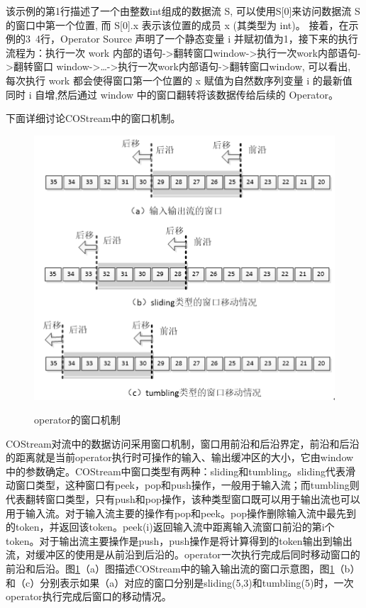 该示例的第1行描述了一个由整数int组成的数据流 S, 可以使用S[0]来访问数据流 S 的窗口中第一个位置, 而 S[0].x 表示该位置的成员 x (其类型为 int)。 接着，在示例的3~4行，Operator Source 声明了一个静态变量 i 并赋初值为1，接下来的执行流程为：执行一次 work 内部的语句->翻转窗口window->执行一次work内部语句->翻转窗口 window->…->执行一次work内部语句->翻转窗口window, 可以看出, 每次执行 work 都会使得窗口第一个位置的 x 赋值为自然数序列变量 i 的最新值 同时 i 自增,然后通过 window 中的窗口翻转将该数据传给后续的 Operator。

下面详细讨论COStream中的窗口机制。
\begin{figure}[htbp]
	\centering
	\includegraphics[width=5in]{Img/Chap_Application/Yu/operator.png}\\
	\caption{operator的窗口机制}\label{fig:operator}
\end{figure}
COStream对流中的数据访问采用窗口机制，窗口用前沿和后沿界定，前沿和后沿的距离就是当前operator执行时可操作的输入、输出缓冲区的大小，它由window中的参数确定。COStream中窗口类型有两种：sliding和tumbling。sliding代表滑动窗口类型，这种窗口有peek，pop和push操作，一般用于输入流；而tumbling则代表翻转窗口类型，只有push和pop操作，该种类型窗口既可以用于输出流也可以用于输入流。对于输入流主要的操作有pop和peek。pop操作删除输入流中最先到的token，并返回该token。peek(i)返回输入流中距离输入流窗口前沿的第i个token。对于输出流主要操作是push，push操作是将计算得到的token输出到输出流，对缓冲区的使用是从前沿到后沿的。operator一次执行完成后同时移动窗口的前沿和后沿。图\ref{fig:operator}（a）图描述COStream中的输入输出流的窗口示意图，图\ref{fig:operator}（b）和（c）分别表示如果（a）对应的窗口分别是sliding(5,3)和tumbling(5)时，一次operator执行完成后窗口的移动情况。


